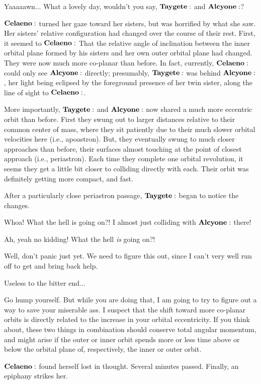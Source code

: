 \Celaeno Yaaaaawn... What a lovely day, wouldn't you say, $\Taygete$ and $\Alcyone$?

$\Celaeno$ turned her gaze toward her sisters, but was horrified by what she saw.  Her sisters' relative configuration had changed over the course of their rest.  First, it seemed to $\Celaeno$ That the relative angle of inclination between the inner orbital plane formed by his sisters and her own outer orbital plane had changed.  They were now much more co-planar than before.  In fact, currently, $\Celaeno$ could only see $\Alcyone$ directly; presumably, $\Taygete$ was behind $\Alcyone$, her light being eclipsed by the foreground presence of her twin sister, along the line of sight to $\Celaeno$.

More importantly, $\Taygete$ and $\Alcyone$ now shared a much more eccentric orbit than before.  First they swung out to larger distances relative to their common center of mass, where they sit patiently due to their much slower orbital velocities here (i.e., apoastron).  But, they eventually swung to much closer approaches than before, their surfaces almost touching at the point of closest approach (i.e., periastron).  Each time they complete one orbital revolution, it seems they get a little bit closer to colliding directly with each.  Their orbit was definitely getting more compact, and fast.

After a particularly close periastron passage, $\Taygete$ began to notice the changes.

\Taygete  Whoa!  What the hell is going on?!  I almost just colliding with $\Alcyone$ there!

\Alcyone Ah, yeah no kidding!  What the hell \textit{is} going on?!

\Celaeno  Well, don't panic just yet.  We need to figure this out, since I can't very well run off to get and bring back help.

\Alcyone Useless to the bitter end...

\Celaeno Go hump yourself.  But while you are doing that, I am going to try to figure out a way to save your miserable ass.  I suspect that the shift toward more co-planar orbits is directly related to the increase in your orbital eccentricity.  If you think about, these two things in combination should conserve total angular momentum, and might arise if the outer or inner orbit spends more or less time above or below the orbital plane of, respectively, the inner or outer orbit.

$\Celaeno$ found herself lost in thought.  Several minutes passed.  Finally, an epiphany strikes her.

